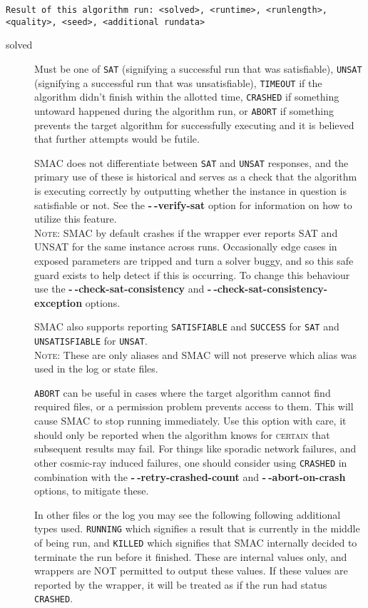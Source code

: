 \documentclass[manual.tex]{subfiles}
\begin{document}
\texttt{Result of this algorithm run: <solved>, <runtime>, <runlength>, <quality>, <seed>, <additional rundata>} 
\begin{description}

\item [{solved}] Must be one of \texttt{SAT} (signifying a successful run that was satisfiable), \texttt{UNSAT} (signifying a successful run that was unsatisfiable), \texttt{TIMEOUT} if the algorithm didn't finish within the allotted time, \texttt{CRASHED} if something untoward happened during the algorithm run, or \texttt{ABORT} if something prevents the target algorithm for successfully executing and it is believed that further attempts would be futile. 

SMAC does not differentiate between \texttt{SAT} and \texttt{UNSAT} responses, and the primary use of these is historical and serves as a check that the algorithm is executing correctly by outputting whether the instance in question is satisfiable or not. See the \textbf{-$\!~$-verify-sat} option for information on how to utilize this feature. 
\\
\textsc{Note:} SMAC by default crashes if the wrapper ever reports SAT and UNSAT for the same instance across runs. Occasionally edge cases in exposed parameters are tripped and turn a solver buggy, and so this safe guard exists to help detect if this is occurring. To change this behaviour use the \textbf{-$\!~$-check-sat-consistency} and \textbf{-$\!~$-check-sat-consistency-exception} options.

SMAC also supports reporting \texttt{SATISFIABLE} and \texttt{SUCCESS} for \texttt{SAT} and \texttt{UNSATISFIABLE} for \texttt{UNSAT}.
\\ \textsc{Note:} These are only aliases and SMAC will not preserve which alias was used in the log or state files.

\texttt{ABORT} can be useful in
cases where the target algorithm cannot find required files, or a
permission problem prevents access to them. This will cause SMAC to
stop running immediately. Use this option with care, it should only be reported when the algorithm knows for \textsc{certain} that subsequent results may fail. For things like sporadic network failures, and other cosmic-ray induced failures, one should consider using \texttt{CRASHED} in combination with the \textbf{-$\!~$-retry-crashed-count}  and \textbf{-$~\!\!$-abort-on-crash} options, to mitigate these.

In other files or the log you may see the following following additional types used. \texttt{RUNNING} which signifies a result that is currently in the middle of being run, and \texttt{KILLED} which signifies that SMAC internally decided to terminate the run before it finished. These are internal values only, and wrappers are NOT permitted to output these values. If these values are reported by the wrapper, it will be treated as if the run had status \texttt{CRASHED}.


\end{description}
\end{document}
